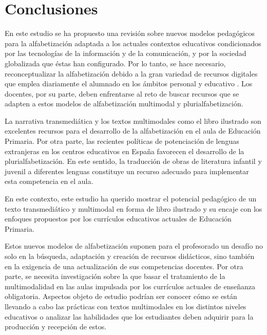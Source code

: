 \documentclass[spanish]{textolivre}
\begin{document}


\section{Conclusiones}\label{sec-organizacao}
En este estudio se ha propuesto una revisión sobre nuevos modelos pedagógicos para la alfabetización adaptada a los actuales contextos educativos condicionados por las tecnologías de la información y de la comunicación, y por la sociedad globalizada que éstas han configurado. Por lo tanto, se hace necesario, reconceptualizar la alfabetización debido a la gran variedad de recursos digitales que emplea diariamente el alumnado en los ámbitos personal y educativo \cite{lopez_pena_propuesta_2022}. Los docentes, por su parte, deben enfrentarse al reto de buscar recursos que se adapten a estos modelos de alfabetización multimodal y plurialfabetización.

La narrativa transmediática y los textos multimodales como el libro ilustrado son excelentes recursos para el desarrollo de la alfabetización en el aula de Educación Primaria. Por otra parte, las recientes políticas de potenciación de lenguas extranjeras en los centros educativos en España favorecen el desarrollo de la plurialfabetización. En este sentido, la traducción de obras de literatura infantil y juvenil a diferentes lenguas constituye un recurso adecuado para implementar esta competencia en el aula.

En este contexto, este estudio ha querido mostrar el potencial pedagógico de un texto transmediático y multimodal en forma de libro ilustrado y su encaje con los enfoques propuestos por los currículos educativos actuales de Educación Primaria.

Estos nuevos modelos de alfabetización suponen para el profesorado un desafío no solo en la búsqueda, adaptación y creación de recursos didácticos, sino también en la exigencia de una actualización de sus competencias docentes. Por otra parte, se necesita investigación sobre la que basar el tratamiento de la multimodalidad en las aulas impulsada por los currículos actuales de enseñanza obligatoria. Aspectos objeto de estudio podrían ser conocer cómo se están llevando a cabo las prácticas con textos multimodales en los distintos niveles educativos o analizar las habilidades que los estudiantes deben adquirir para la producción y recepción de estos.
\end{document}
